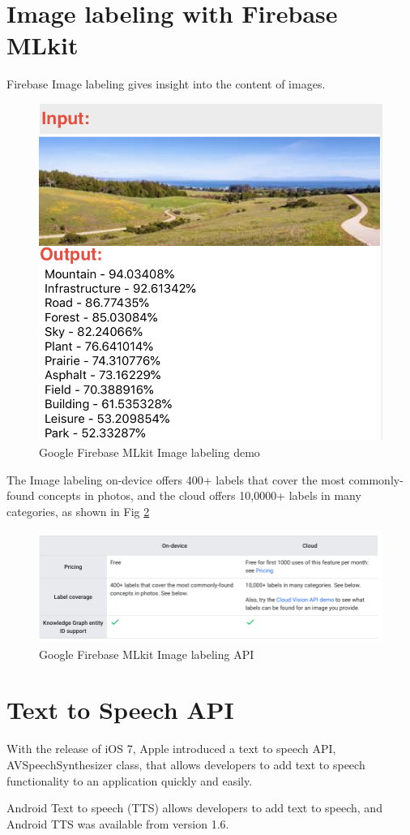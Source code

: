 \documentclass[11pt]{ucscthesis}
\begin{document}
\section{Image labeling with Firebase MLkit}
Firebase Image labeling \cite{MLImageLable} gives insight into the content of images. 
\begin{figure}
    \centering
    \includegraphics[width =0.5\linewidth]{Fig/Imagelabelingdemo.png}
    \caption{Google Firebase MLkit Image labeling demo}
    \label{MLkitImage labeling}
\end{figure}
The Image labeling on-device offers 400+ labels that cover the most commonly-found concepts in photos, and the cloud offers 10,0000+ labels in many categories, as shown in Fig \ref{Firebase MLkitImage labeling}
\begin{figure}
    \centering
    \includegraphics[width =0.5\linewidth]{Fig/FirebaseImageLabeling.png}
    \caption{Google Firebase MLkit Image labeling API\cite{MLImageLable}}
    \label{Firebase MLkitImage labeling}
\end{figure}

\section{Text to Speech API}
With the release of iOS 7, Apple introduced a text to speech API, AVSpeechSynthesizer class\cite{AVSpeechSynthesizer}, that allows developers to add text to speech functionality to an application quickly and easily.

Android Text to speech (TTS)\cite{TTSandroid} allows developers to add text to speech, and Android TTS was available from version 1.6.
\end{document}
